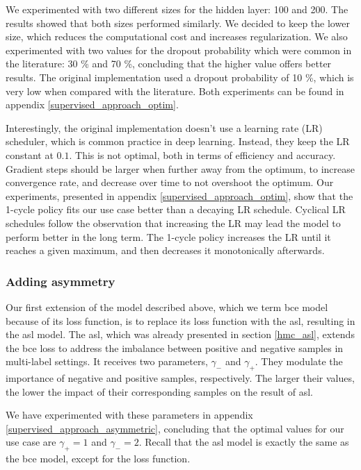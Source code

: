 We experimented with two different sizes for the hidden layer: 100 and 200. The results showed that both sizes performed similarly. We decided to keep the lower size, which reduces the computational cost and increases regularization. We also experimented with two values for the dropout probability which were common in the literature: 30 \% and 70 \%, concluding that the higher value offers better results. The original implementation used a dropout probability of 10 \%, which is very low when compared with the literature. Both experiments can be found in appendix \ref{supervised_approach_optim}.

Interestingly, the original implementation doesn't use a learning rate (LR) scheduler, which is common practice in deep learning. Instead, they keep the LR constant at $0.1$. This is not optimal, both in terms of efficiency and accuracy. Gradient steps should be larger when further away from the optimum, to increase convergence rate, and decrease over time to not overshoot the optimum. Our experiments, presented in appendix \ref{supervised_approach_optim}, show that the 1-cycle policy fits our use case better than a decaying LR schedule. Cyclical LR schedules \cite{smith2017cyclical} follow the observation that increasing the LR may lead the model to perform better in the long term. The 1-cycle policy increases the LR until it reaches a given maximum, and then decreases it monotonically afterwards.

\subsubsection{Adding asymmetry} \label{supervised_approach_add_asymmetry}

Our first extension of the model described above, which we term \acrshort{bce} model because of its loss function, is to replace its loss function with the \acrfull{asl}, resulting in the \acrshort{asl} model. The \acrshort{asl}, which was already presented in section \ref{hmc_asl}, extends the \acrfull{bce} loss to address the imbalance between positive and negative samples in multi-label settings. It receives two parameters, $\gamma_-$ and $\gamma_+$. They modulate the importance of negative and positive samples, respectively. The larger their values, the lower the impact of their corresponding samples on the result of \acrshort{asl}.

We have experimented with these parameters in appendix \ref{supervised_approach_asymmetric}, concluding that the optimal values for our use case are $\gamma_+=1$ and $\gamma_-=2$. Recall that the \acrshort{asl} model is exactly the same as the \acrshort{bce} model, except for the loss function.

